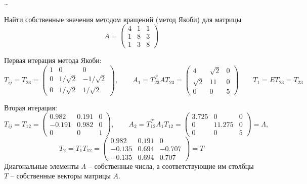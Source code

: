 \ldots


\begin{problem}
    Найти собственные значения методом вращений (метод Якоби) для матрицы
    \begin{equation*}
        A = \begin{pmatrix}
            4 & 1 & 1\\
            1 & 8 & 3\\
            1 & 3 & 8
        \end{pmatrix}
    \end{equation*}
\end{problem}

Первая итерация метода Якоби:
\begin{equation*}
    T_{ij} = T_{23} =
    \begin{pmatrix}
        1 & 0 & 0\\
        0 & 1/\sqrt{2} & -1/\sqrt{2}\\
        0 & 1/\sqrt{2} & 1/\sqrt{2}
    \end{pmatrix},
    \qquad
    A_1 = T_{23}^T A T_{23} =
    \begin{pmatrix}
        4 & \sqrt{2} & 0\\
        \sqrt{2} & 11 & 0\\
        0 & 0 & 5
    \end{pmatrix}
    \qquad
    T_1 = E T_{23} = T_{23}
\end{equation*}

Вторая итерация:
\begin{equation*}
    T_{ij} = T_{12} =
    \begin{pmatrix}
        0.982 & 0.191 & 0\\
        -0.191 & 0.982 & 0\\
        0 & 0 & 1
    \end{pmatrix},
    \qquad
    A_2 = T_{12}^T A_1 T_{12} =
    \begin{pmatrix}
        3.725 & 0 & 0\\
        0 & 11.275 & 0\\
        0 & 0 & 5
    \end{pmatrix}
     = \Lambda,
\end{equation*}
\begin{equation*}
    T_2 = T_1 T_{12} =
    \begin{pmatrix}
        0.982 & 0.191 & 0\\
        -0.135 & 0.694 & -0.707\\
        -0.135 & 0.694 & 0.707
    \end{pmatrix}
    = T
\end{equation*}
Диагональные элементы $\Lambda$ -- собственные числа, а соответствующие им
столбцы $T$ -- собственные векторы матрицы $A$.


